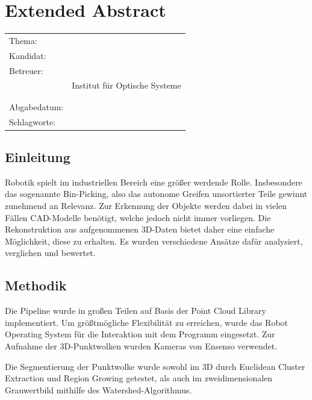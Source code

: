 \thispagestyle{plain}
\chapter*{Extended Abstract}
\label{ch:extended-abstract}

\begin{refsection}

\begin{center}
	\begin{tabular}{p{3cm}p{10cm}}
		Thema: & \thema \\[1ex]
		Kandidat: & \autor \\[1ex]
		Betreuer: & \prueferA \\
		 & Institut für Optische Systeme\\[1ex]
		 & \prueferB \\
		 & \firma \\[1ex]
		Abgabedatum: & \abgabedatum \\[1ex]
		Schlagworte: & \schlagworte \\[1ex]
	\end{tabular}
\end{center}


\section*{Einleitung}

Robotik spielt im industriellen Bereich eine größer werdende Rolle.
Insbesondere das sogenannte Bin-Picking, also das autonome Greifen unsortierter Teile gewinnt zunehmend an Relevanz.
Zur Erkennung der Objekte werden dabei in vielen Fällen CAD-Modelle benötigt, welche jedoch nicht immer vorliegen.
Die Rekonstruktion aus aufgenommenen 3D-Daten bietet daher eine einfache Möglichkeit, diese zu erhalten.
Es wurden verschiedene Ansätze dafür analysiert, verglichen und bewertet.


\section*{Methodik}

Die Pipeline wurde in großen Teilen auf Basis der Point Cloud Library \cite{rusu2011pcl} implementiert.
Um größtmögliche Flexibilität zu erreichen, wurde das Robot Operating System \cite{quigley2009ros} für die Interaktion mit dem Programm eingesetzt.
Zur Aufnahme der 3D-Punktwolken wurden Kameras von Ensenso \cite{ensensoWebsite} verwendet.

Die Segmentierung der Punktwolke wurde sowohl im 3D durch Euclidean Cluster Extraction und Region Growing getestet, als auch im zweidimensionalen Grauwertbild mithilfe des Watershed-Algorithmus.


\end{refsection}
